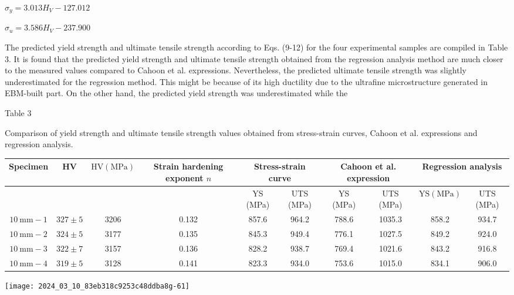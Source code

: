 \documentclass[10pt]{article}
\begin{document}
$\sigma_{y}=3.013 H_{V}-127.012$

$\sigma_{u}=3.586 H_{V}-237.900$

The predicted yield strength and ultimate tensile strength according to Eqs. (9-12) for the four experimental samples are compiled in Table 3. It is found that the predicted yield strength and ultimate tensile strength obtained from the regression analysis method are much closer to the measured values compared to Cahoon et al. expressions. Nevertheless, the predicted ultimate tensile strength was slightly underestimated for the regression method. This might be because of its high ductility due to the ultrafine microstructure generated in EBM-built part. On the other hand, the predicted yield strength was underestimated while the

Table 3

Comparison of yield strength and ultimate tensile strength values obtained from stress-strain curves, Cahoon et al. expressions and regression analysis.

\begin{center}
\begin{tabular}{|c|c|c|c|c|c|c|c|c|c|}
\hline
\multirow[t]{2}{*}{Specimen} & \multirow[t]{2}{*}{HV} & \multirow[t]{2}{*}{$\mathrm{HV}(\mathrm{MPa})$} & \multirow[t]{2}{*}{Strain hardening exponent $n$} & \multicolumn{2}{|c|}{Stress-strain curve} & \multicolumn{2}{|c|}{Cahoon et al. expression} & \multicolumn{2}{|c|}{Regression analysis} \\
\hline
 &  &  &  & YS (MPa) & UTS (MPa) & YS (MPa) & UTS (MPa) & $\mathrm{YS}(\mathrm{MPa})$ & UTS (MPa) \\
\hline
$10 \mathrm{~mm}-1$ & $327 \pm 5$ & 3206 & 0.132 & 857.6 & 964.2 & 788.6 & 1035.3 & 858.2 & 934.7 \\
\hline
$10 \mathrm{~mm}-2$ & $324 \pm 5$ & 3177 & 0.135 & 845.3 & 949.4 & 776.1 & 1027.5 & 849.2 & 924.0 \\
\hline
$10 \mathrm{~mm}-3$ & $322 \pm 7$ & 3157 & 0.136 & 828.2 & 938.7 & 769.4 & 1021.6 & 843.2 & 916.8 \\
\hline
$10 \mathrm{~mm}-4$ & $319 \pm 5$ & 3128 & 0.141 & 823.3 & 934.0 & 753.6 & 1015.0 & 834.1 & 906.0 \\
\hline
\end{tabular}
\end{center}

\begin{center}
\texttt{[image: 2024\_03\_10\_83eb318c9253c48ddba8g-61]}
\end{center}
\end{document}
